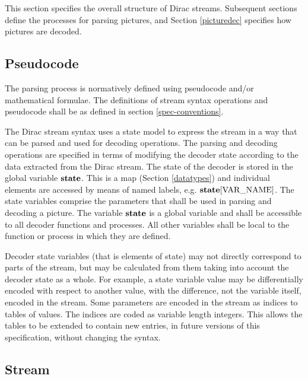 
\label{streamstructure}

This section specifies the overall structure of Dirac streams. 
Subsequent sections define the processes for 
parsing pictures, and Section \ref{picturedec} specifies how pictures 
are decoded.

\subsection{Pseudocode}
The parsing process is normatively defined using pseudocode and/or mathematical formulae.
 The definitions of stream syntax operations and pseudocode shall be as defined in 
section \ref{spec-conventions}. 

The Dirac stream syntax uses a state model to express the stream in a way that can 
be parsed and used for decoding operations. The parsing and decoding operations are 
specified in terms of modifying the decoder state according to the data extracted 
from the Dirac stream. The state of the decoder is stored in the global variable $\textbf{state}$.
 This is a map (Section \ref{datatypes}) and individual elements are accessed by 
means of named labels, e.g. $\textbf{state}[\text{VAR\_NAME}]$. 
The state variables comprise the parameters that shall be used in parsing and decoding a picture. 
The variable $\textbf{state}$ is a global variable and shall be accessible to all decoder functions and processes. 
All other variables shall be local to the function or process in which they are defined.

Decoder state variables (that is elements of state) may not directly correspond 
to parts of the stream, but may be calculated from them taking into account the 
decoder state as a whole. For example, a state variable value may be differentially 
encoded with respect to another value, with the difference, not the variable itself, 
encoded in the stream. Some parameters are encoded in the stream as indices
 to tables of values. The indices are coded as variable length integers. 
This allows the tables to be extended to contain new entries, in future versions 
of this specification, without changing the syntax.


\subsection{Stream}
\label{stream}

